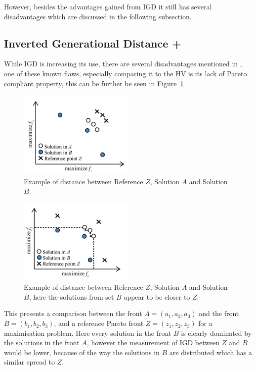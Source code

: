However, besides the advantages gained from IGD it still has several disadvantages which are discussed in the following subsection.\\

\subsection{Inverted Generational Distance +}

While IGD is increasing its use, there are several disadvantages mentioned in \cite{ishibuchi2015study}, one of these known flaws, especially comparing it to the HV is its lack of Pareto compliant property, this can be further be seen in Figure~\ref{fig:igd_comp_1}

\begin{figure}[H]
    \centering
    \includegraphics[width=0.5\textwidth]{images/igd_comp_1.png}
    \caption{Example of distance between Reference $Z$, Solution $A$ and Solution $B$.}
    \label{fig:igd_comp_1}
\end{figure}

\begin{figure}[H]
    \centering
    \includegraphics[width=0.5\textwidth]{images/igd_comp_2.png}
    \caption{Example of distance between Reference $Z$, Solution $A$ and Solution $B$, here the solutions from set $B$ appear to be closer to $Z$.}
    \label{fig:igd_comp_2}
\end{figure}

This presents a comparison between the front $A = (a_1, a_2, a_3)$ and the front $B = (b_1, b_2, b_3)$, and a reference Pareto front $Z = (z_1, z_2, z_3)$ for a maximisation problem. Here every solution in the front $B$ is clearly dominated by the solutions in the front $A$, however the measurement of IGD between $Z$ and $B$ would be lower, because of the way the solutions in $B$ are distributed which has a similar spread to $Z$.\\

